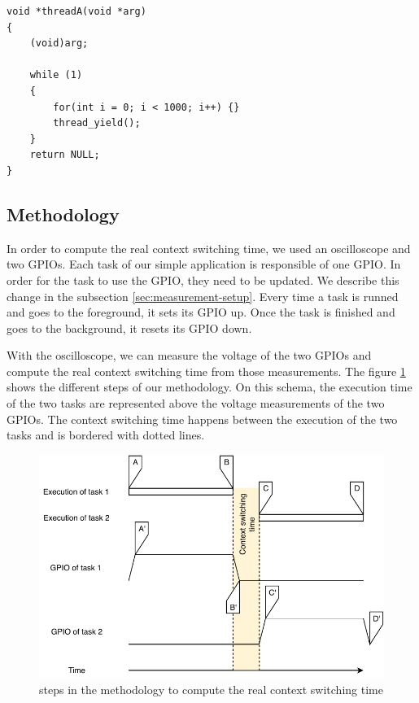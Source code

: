 \begin{lstlisting}[style=CStyle, float, label={lst:simple-task-code-riot}, caption={source code of a task implemented in RIOT for the simple application}]
void *threadA(void *arg)
{
    (void)arg;

    while (1)
    {
        for(int i = 0; i < 1000; i++) {}
        thread_yield();
    }
    return NULL;
}
\end{lstlisting}


\subsection{Methodology}

In order to compute the real context switching time, we used an oscilloscope and two GPIOs.
Each task of our simple application is responsible of one GPIO.
In order for the task to use the GPIO, they need to be updated.
We describe this change in the subsection \ref{sec:measurement-setup}.
Every time a task is runned and goes to the foreground, it sets its GPIO up.
Once the task is finished and goes to the background, it resets its GPIO down.

With the oscilloscope, we can measure the voltage of the two GPIOs and compute the real context switching time from those measurements.
The figure \ref{fig:real-context-switching-time-measurement} shows the different steps of our methodology.
On this schema, the execution time of the two tasks are represented above the voltage measurements of the two GPIOs.
The context switching time happens between the execution of the two tasks and is bordered with dotted lines.

\begin{figure}[!ht]
  \centering
  \includegraphics[scale=1]{assets/real-context-switching-time-measurement.pdf}
  \caption{\label{fig:real-context-switching-time-measurement}steps in the methodology to compute the real context switching time}
\end{figure}

